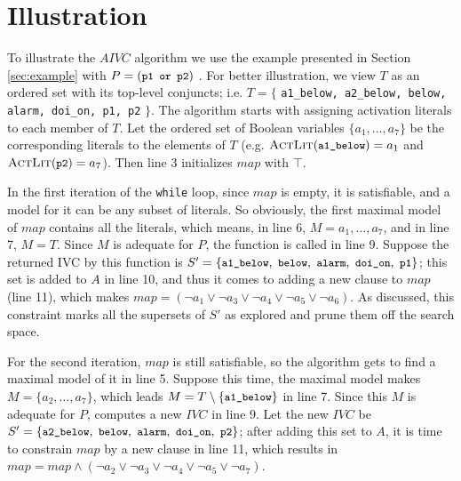\section{Illustration}
\label{sec:illust}
To illustrate the $AIVC$ algorithm we use the example presented in Section \ref{sec:example} with $P = (\small{\texttt{p1 or p2}})$ .
For better illustration, we view $T$ as an ordered set with its top-level conjuncts; i.e. $T = \{$ {\small \texttt{a1\_below, a2\_below, below, alarm, doi\_on, p1, p2}} $\}$.
The algorithm starts with assigning activation literals to each member of $T$. Let the ordered set of Boolean variables $\{ a_1, \ldots , a_7 \}$ be the corresponding literals to the elements of $T$ (e.g. $\actlit (\small{\texttt{a1\_below}}) = a_1$ and $\actlit (\small{\texttt{p2}}) = a_7$). Then line 3 initializes $map$ with $\top$. 

In the first iteration of the \texttt{while} loop, since $map$ is empty,
it is satisfiable, and a model for it can
be any subset of literals. So obviously, the first maximal model of $map$ contains all the literals, which means, in line 6, $M = {a_1, \ldots, a_7}$,
 and in line 7, $M = T$. Since $M$ is adequate for $P$, 
 the function \getivc is called in line 9. 
 Suppose the returned IVC by this function  is 
 $S' = \{ \small{ \texttt{a1\_below},~\texttt{below}, ~\texttt{alarm},
~\texttt{doi\_on},~\texttt{p1}}\}$; 
this set is added to $A$ in line 10, and thus it comes to adding a new clause to $map$ (line 11), which makes $map = (\neg a_1 \vee \neg a_3 \vee \neg a_4 \vee \neg a_5 \vee \neg a_6)$. 
As discussed, this constraint marks all the supersets of $S'$ as explored and prune them off the search space.

For the second iteration, $map$ is still satisfiable, 
so the algorithm gets to find a maximal model of it in line 5. Suppose this time, the maximal model makes $M = \{a_2, \ldots, a_7\}$, 
which leads $M = T \setminus \{\small{\texttt{a1\_below}}\} $ in line 7. 
Since this $M$ is adequate for $P$, \getivc computes a new $IVC$ in line 9. 
Let the new $IVC$ be $S' = \{ \small{ \texttt{a2\_below},~\texttt{below}, ~\texttt{alarm},
~\texttt{doi\_on},~\texttt{p2}}\}$; after adding this set to $A$, 
it is time to constrain $map$ by a new clause in line 11, 
which results in $map = map \wedge (\neg a_2 \vee \neg a_3 \vee \neg a_4 \vee \neg a_5 \vee \neg a_7)$. 

